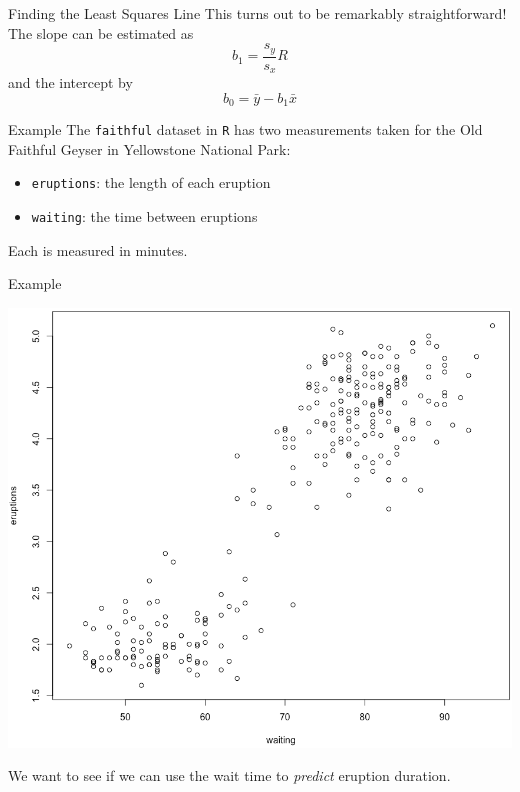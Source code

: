 \begin{frame}{Finding the Least Squares Line}
    This turns out to be remarkably straightforward! The slope can be estimated as
    \[
        b_1 = \frac{s_y}{s_x}R
    \]
    and the intercept by 
    \[
        b_0 = \bar{y} - b_1 \bar{x}
    \]
\end{frame}

\begin{frame}{Example}
    The \texttt{faithful} dataset in \texttt{R} has two measurements taken for the Old Faithful Geyser in Yellowstone National Park:
    \begin{itemize}
        \item \texttt{eruptions}: the length of each eruption
        \item \texttt{waiting}: the time between eruptions
    \end{itemize}
    Each is measured in minutes.
\end{frame}

\begin{frame}{Example}
    \begin{center}
        \includegraphics[scale=0.25]{images/geyserscatter.png}
    \end{center}
    
    \vspace{-0.5cm}We want to see if we can use the wait time to \textit{predict} eruption duration.
\end{frame}

